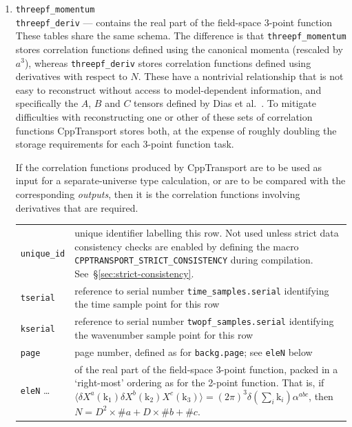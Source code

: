 \documentclass[11pt,a4paper]{article}
\newcommand{\vect}[1]{\bm{\mathrm{{#1}}}}
\newcommand{\packagefont}{\sffamily}
\newcommand{\CppTransport}{{\packagefont CppTransport}}
\newcommand{\semibold}[1]{{\fontseries{b}\selectfont{#1}}}
\newenvironment{sqltablelist}{\renewcommand{\arraystretch}{1.3}\small}{}
\begin{document}
\begin{sqltablelist}
\begin{enumerate}
    \item \texttt{threepf_momentum} \\
    \texttt{threepf_deriv} --- contains
    the real part of the field-space 3-point function \\
    These tables share the same schema. The difference is that
    \texttt{threepf_momentum} stores correlation functions defined using
    the canonical momenta (rescaled by $a^3$), whereas
    \texttt{threepf_deriv} stores correlation functions defined using
    derivatives with respect to $N$.
    These have a nontrivial relationship that is not easy to reconstruct without
    access to model-dependent information, and specifically the $A$, $B$ and
    $C$ tensors defined by Dias et al.~\cite{}.
    To mitigate difficulties with reconstructing one or other of these
    sets of correlation functions {\CppTransport} stores both, at the expense
    of roughly doubling the storage requirements for each 3-point function task.
    
    If the correlation functions produced by {\CppTransport} are to be used as
    input for a separate-universe type calculation,
    or are to be compared with the corresponding \emph{outputs},
    then it is the correlation functions involving derivatives that are required.
    \\
    \begin{tabular}{p{2.5cm}p{11.2cm}}
        \texttt{unique_id} & unique identifier labelling this row. Not used
        unless strict data consistency checks are enabled
        by defining the macro
        \texttt{CPPTRANSPORT_STRICT_CONSISTENCY} during
        compilation. See~\S\ref{sec:strict-consistency}. \\
        \texttt{tserial} & reference to serial number
        \texttt{time_samples.serial} identifying the time sample point for this row \\
        \texttt{kserial} & reference to serial number
        \texttt{twopf_samples.serial} identifying the wavenumber sample point for this row \\
        \texttt{page} & page number, defined as for \texttt{backg.page}; see
        \texttt{eleN} below \\
        \texttt{eleN} \ldots & \semibold{dimensionless components}
        of the real part of the field-space 3-point
        function, packed in a `right-most' ordering as for the 2-point function.
        That is, if
        $\langle \delta X^a(\vect{k}_1) \delta X^b(\vect{k}_2) X^c(\vect{k}_3) \rangle =
        (2\pi)^3 \delta(\sum_i \vect{k}_i) \alpha^{abc}$,
        then
        $N = D^2 \times \#a + D \times \#b + \#c$.
        

\end{tabular}
\end{enumerate}
\end{sqltablelist}
\end{document}

